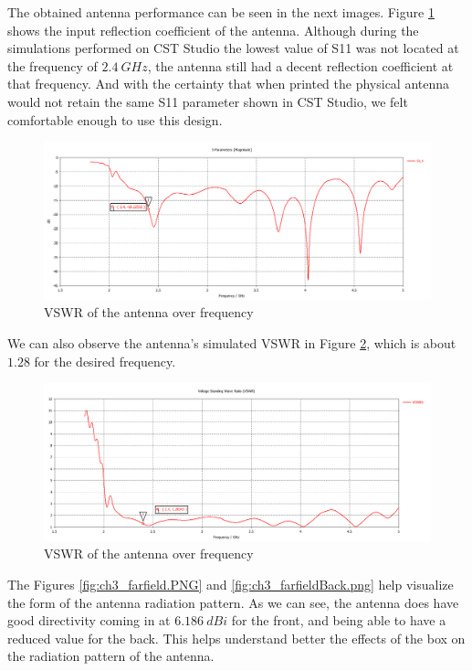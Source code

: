 \par The obtained antenna performance can be seen in the next images. Figure \ref{fig:ch3_s11.png} shows the input reflection coefficient of the antenna. Although during the simulations performed on CST Studio the lowest value of S11 was not located at the frequency of $2.4\:\si{GHz}$, the antenna still had a decent reflection coefficient at that frequency. And with the certainty that when printed the physical antenna would not retain the same S11 parameter shown in CST Studio, we felt comfortable enough to use this design. 

\begin{figure}[H]
    \vspace*{0cm}
    \centering
    \includegraphics[width=0.9\linewidth]{figs/ch3_s11.png}
    \caption{VSWR of the antenna over frequency}
    \label{fig:ch3_s11.png}
\end{figure}

\par We can also observe the antenna's simulated VSWR in Figure \ref{fig:ch3_VSWR.png}, which is about $1.28$ for the desired frequency.

\begin{figure}[H]
    \vspace*{0cm}
    \centering
    \includegraphics[width=0.9\linewidth]{figs/ch3_VSWR.png}
    \caption{VSWR of the antenna over frequency}
    \label{fig:ch3_VSWR.png}
\end{figure}

\par The Figures \ref{fig:ch3_farfield.PNG} and \ref{fig:ch3_farfieldBack.png} help visualize the form of the antenna radiation pattern. As we can see, the antenna does have good directivity coming in at $6.186\:\si{dBi}$ for the front, and being able to have a reduced value for the back. This helps understand better the effects of the box on the radiation pattern of the antenna.


